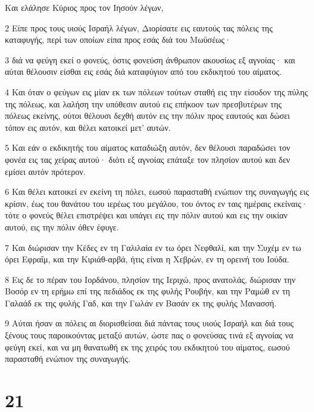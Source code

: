 \par Και ελάλησε Κύριος προς τον Ιησούν λέγων,
\par 2 Είπε προς τους υιούς Ισραήλ λέγων, Διορίσατε εις εαυτούς τας πόλεις της καταφυγής, περί των οποίων είπα προς εσάς διά του Μωϋσέως·
\par 3 διά να φεύγη εκεί ο φονεύς, όστις φονεύση άνθρωπον ακουσίως εξ αγνοίας· και αύται θέλουσιν είσθαι εις εσάς διά καταφύγιον από του εκδικητού του αίματος.
\par 4 Και όταν ο φεύγων εις μίαν εκ των πόλεων τούτων σταθή εις την είσοδον της πύλης της πόλεως, και λαλήση την υπόθεσιν αυτού εις επήκοον των πρεσβυτέρων της πόλεως εκείνης, ούτοι θέλουσι δεχθή αυτόν εις την πόλιν προς εαυτούς και δώσει τόπον εις αυτόν, και θέλει κατοικεί μετ' αυτών.
\par 5 Και εάν ο εκδικητής του αίματος καταδιώξη αυτόν, δεν θέλουσι παραδώσει τον φονέα εις τας χείρας αυτού· διότι εξ αγνοίας επάταξε τον πλησίον αυτού και δεν εμίσει αυτόν πρότερον.
\par 6 Και θέλει κατοικεί εν εκείνη τη πόλει, εωσού παρασταθή ενώπιον της συναγωγής εις κρίσιν, έως του θανάτου του ιερέως του μεγάλου, του όντος εν ταις ημέραις εκείναις· τότε ο φονεύς θέλει επιστρέψει και υπάγει εις την πόλιν αυτού και εις την οικίαν αυτού, εις την πόλιν όθεν έφυγε.
\par 7 Και διώρισαν την Κέδες εν τη Γαλιλαία εν τω όρει Νεφθαλί, και την Συχέμ εν τω όρει Εφραΐμ, και την Κιριάθ-αρβά, ήτις είναι η Χεβρών, εν τη ορεινή του Ιούδα.
\par 8 Εις δε το πέραν του Ιορδάνου, πλησίον της Ιεριχώ, προς ανατολάς, διώρισαν την Βοσόρ εν τη ερήμω επί της πεδιάδος εκ της φυλής Ρουβήν, και την Ραμώθ εν τη Γαλαάδ εκ της φυλής Γαδ, και την Γωλάν εν Βασάν εκ της φυλής Μανασσή.
\par 9 Αύται ήσαν αι πόλεις αι διορισθείσαι διά πάντας τους υιούς Ισραήλ και διά τους ξένους τους παροικούντας μεταξύ αυτών, ώστε πας ο φονεύσας τινά εξ αγνοίας να φεύγη εκεί, και να μη θανατωθή εκ της χειρός του εκδικητού του αίματος, εωσού παρασταθή ενώπιον της συναγωγής.

\chapter{21}

